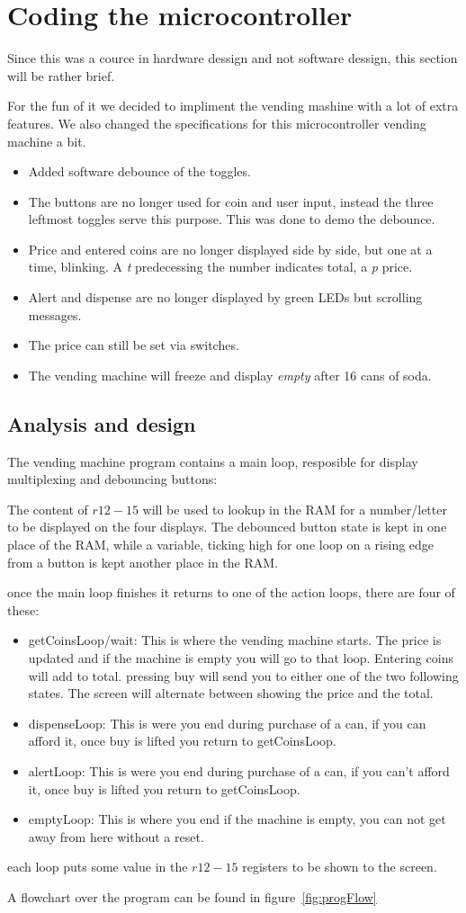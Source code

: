 \section{Coding the microcontroller}
Since this was a cource in hardware dessign and not software dessign, this
section will be rather brief.

For the fun of it we decided to impliment the vending mashine with a lot of
extra features. We also changed the specifications for this microcontroller
vending machine a bit.
\begin{itemize}
  \item Added software debounce of the toggles.
  \item The buttons are no longer used for coin and user input,
  instead the three leftmost toggles serve this purpose. This was done to demo
  the debounce.
  \item Price and entered coins are no longer displayed side by side, but one at
  a time, blinking. A \emph{t} predecessing the number indicates total, a
  \emph{p} price.
  \item Alert and dispense are no longer displayed by green LEDs but scrolling
  messages.
  \item The price can still be set via switches.
  \item The vending machine will freeze and display \emph{empty} after 16 cans
  of soda.
\end{itemize}

\subsection{Analysis and design}
The vending machine program contains a main loop,
resposible for display multiplexing and debouncing buttons:

The content of $r12-15$ will be used to lookup in the RAM for a number/letter to
be displayed on the four displays.
The debounced button state is kept in one place of the RAM,
while a variable, ticking high for one loop on a rising edge from a button is
kept another place in the RAM.

once the main loop finishes it returns to one of the action loops,
there are four of these:
\begin{itemize}
  \item getCoinsLoop/wait: This is where the vending machine starts.
  The price is updated and if the machine is empty you will go to that loop.
   Entering coins will add to total. pressing buy will send you to either one of the two
  following states. The screen will alternate between showing the price and the
  total.
  \item dispenseLoop: This is were you end during purchase of a can, if you can
  afford it, once buy is lifted you return to getCoinsLoop.
  \item alertLoop: This is were you end during purchase of a can, if you can't
  afford it, once buy is lifted you return to getCoinsLoop.
  \item emptyLoop: This is where you end if the machine is empty, you can not
  get away from here without a reset.
\end{itemize}
each loop puts some value in the $r12-15$ registers to be shown to the screen.

A flowchart over the program can be found in figure~\ref{fig:progFlow}
